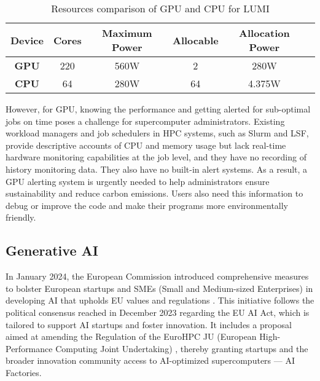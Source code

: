 \begin{table}[H]
    \centering
    \begin{tabular}{|c|c|c|c|c|c|}
        \hline
        \textbf{Device} & \textbf{Cores} & \textbf{Maximum Power} & \textbf{Allocable} & \textbf{Allocation Power} \\
        \hline
        \textbf{GPU} & 220 & 560W & 2 & 280W \\
        \hline
        \textbf{CPU} & 64 & 280W & 64 & 4.375W \\
        \hline
    \end{tabular}
    \caption{Resources comparison of GPU and CPU for LUMI}
    \label{tab:lumi_resources}
\end{table}

However, for GPU, knowing the performance and getting alerted for sub-optimal jobs on time poses a challenge for supercomputer administrators. Existing workload managers and job schedulers in HPC systems, such as Slurm and LSF, provide descriptive accounts of CPU and memory usage but lack real-time hardware monitoring capabilities at the job level, and they have no recording of history monitoring data. They also have no built-in alert systems. As a result, a GPU alerting system is urgently needed to help administrators ensure sustainability and reduce carbon emissions. Users also need this information to debug or improve the code and make their programs more environmentally friendly.


\subsection{Generative AI}
In January 2024, the European Commission introduced comprehensive measures to bolster European startups and SMEs (Small and Medium-sized Enterprises) in developing AI that upholds EU values and regulations \cite{eu-ai}. This initiative follows the political consensus reached in December 2023 regarding the EU AI Act, which is tailored to support AI startups and foster innovation. It includes a proposal aimed at amending the Regulation of the EuroHPC JU (European High-Performance Computing Joint Undertaking) \cite{european_union_2021}, thereby granting startups and the broader innovation community access to AI-optimized supercomputers --- AI Factories.

